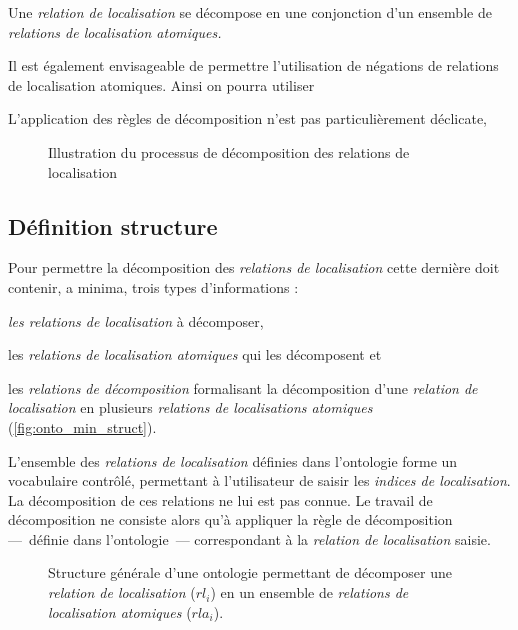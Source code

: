 
Une \emph{relation de localisation} se décompose en une conjonction
d'un ensemble de \emph{relations de localisation atomiques.}



Il est également envisageable de permettre l'utilisation de négations
de relations de localisation atomiques. Ainsi on pourra utiliser




L'application des règles de décomposition n'est pas particulièrement
déclicate, 


\begin{figure}
  \centering
  \caption{Illustration du processus de décomposition des relations de
  localisation}
  \label{fig:logique_dec}
\end{figure}

\subsection{Définition structure}


Pour permettre la décomposition des \emph{relations de localisation}
cette dernière doit contenir, a minima, trois types d'informations :
%
\begin{enumerate*}[label=(\alph*)]
\item \emph{les relations de localisation} à décomposer,
\item les \emph{relations de localisation atomiques} qui les
  décomposent et
\item les \emph{relations de décomposition} formalisant la
  décomposition d'une \emph{relation de localisation} en plusieurs
  \emph{relations de localisations atomiques}
  (\autoref{fig:onto_min_struct}).
\end{enumerate*}
%
L'ensemble des \emph{relations de localisation} définies dans
l'ontologie forme un vocabulaire contrôlé, permettant à l'utilisateur
de saisir les \emph{indices de localisation}. La décomposition de ces
relations ne lui est pas connue. Le travail de décomposition ne
consiste alors qu'à appliquer la règle de décomposition ---~définie
dans l'ontologie~--- correspondant à la \emph{relation de
  localisation} saisie.

\begin{figure}
  \centering
   
  \caption[Structure générale d'une ontologie de
  décomposition]{Structure générale d'une ontologie permettant de
    décomposer une \emph{relation de localisation} ($rl_i$) en un
    ensemble de \emph{relations de localisation atomiques} ($rla_i$).}
  \label{fig:onto_min_struct}
\end{figure}

